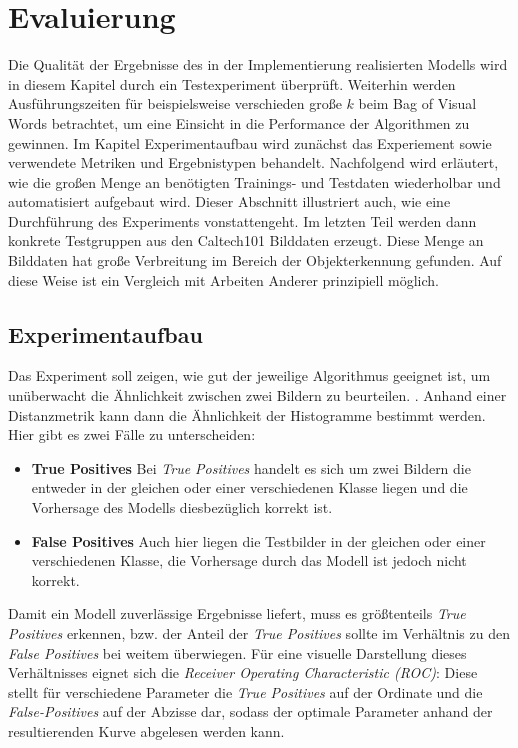\chapter{Evaluierung}

Die Qualität der Ergebnisse des in der Implementierung realisierten Modells wird in diesem Kapitel durch ein Testexperiment überprüft. Weiterhin werden Ausführungszeiten für beispielsweise verschieden große $k$ beim Bag of Visual Words betrachtet, um eine Einsicht in die Performance der Algorithmen zu gewinnen.
Im Kapitel Experimentaufbau wird zunächst das Experiement sowie verwendete Metriken und Ergebnistypen behandelt. Nachfolgend wird erläutert, wie die großen Menge an benötigten Trainings- und Testdaten wiederholbar und automatisiert aufgebaut wird. Dieser Abschnitt illustriert auch, wie eine Durchführung des Experiments vonstattengeht. Im letzten Teil werden dann konkrete Testgruppen aus den Caltech101 \cite{cal2004} Bilddaten erzeugt. Diese Menge an Bilddaten hat große Verbreitung im Bereich der Objekterkennung gefunden. Auf diese Weise ist ein Vergleich mit Arbeiten Anderer prinzipiell möglich.

\section{Experimentaufbau}

Das Experiment soll zeigen, wie gut der jeweilige Algorithmus geeignet ist, um unüberwacht die Ähnlichkeit zwischen zwei Bildern zu beurteilen. . Anhand einer Distanzmetrik kann dann die Ähnlichkeit der Histogramme bestimmt werden. Hier gibt es zwei Fälle zu unterscheiden:

\begin{itemize}
	\item \textbf{True Positives} Bei \textit{True Positives} handelt es sich um zwei Bildern die entweder in der gleichen oder einer verschiedenen Klasse liegen und die Vorhersage des Modells diesbezüglich korrekt ist.
	\item \textbf{False Positives} Auch hier liegen die Testbilder in der gleichen oder einer verschiedenen Klasse, die Vorhersage durch das Modell ist jedoch nicht korrekt.
\end{itemize}

Damit ein Modell zuverlässige Ergebnisse liefert, muss es größtenteils \textit{True Positives} erkennen, bzw. der Anteil der \textit{True Positives} sollte im Verhältnis zu den \textit{False Positives} bei weitem überwiegen. Für eine visuelle Darstellung dieses Verhältnisses eignet sich die \textit{Receiver Operating Characteristic (ROC)}: Diese stellt für verschiedene Parameter die \textit{True Positives} auf der Ordinate und die \textit{False-Positives} auf der Abzisse dar, sodass der optimale Parameter anhand der resultierenden Kurve abgelesen werden kann.

